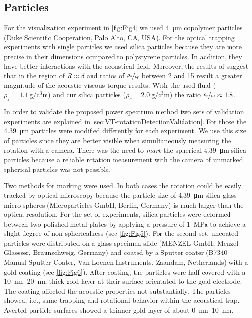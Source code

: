 \subsection{Particles \label{sec:VT-particles}}
For the visualization experiment in \cref{fig:Fig4} we used \SI{4}{\micro\meter} 
copolymer particles (Duke Scientific Cooperation, Palo Alto, CA, USA). For the 
optical trapping experiments with single particles we used silica particles 
because they are more precise in their dimensions compared to polystyrene 
particles. In addition, they have better interactions
with the acoustical field. Moreover, the results of \citeauthor{hahn2016} 
\cite{hahn2016} suggest that in the region of $R \approx \delta$ and ratios of 
$\sfrac{\rho_{\text{s}}}{\rho_{\text{f}}}$ between 2 and 15 result a greater 
magnitude of the acoustic viscous torque results. With the used fluid ($\rho_{f} 
= \SI{1.1}{\gram\per\cubic\centi\meter}$) and our silica particles ($\rho_{s} = 
\SI{2.0}{\gram\per\cubic\centi\meter}$) the ratio 
$\sfrac{\rho_{\text{s}}}{\rho_{\text{f}}} \approx 1.8$.

In order to validate the proposed power spectrum method two sets of validation 
experiments are explained in \cref{sec:VT-rotationDetectionValidation}. For those 
the \SI{4.39}{\micro\meter} particles were modified differently for each 
experiment. We use this size of particles since they are better visible when 
simultaneously measuring the rotation with a camera. There was the need to 
\emph{mark} the spherical \SI{4.39}{\micro\meter} silica particles because a 
reliable rotation measurement with the camera of unmarked spherical particles 
was not possible.

Two methods for marking were used. In both cases the rotation could be easily 
tracked by optical microscopy because the particle size of 
\SI{4.39}{\micro\meter} silica glass micro-spheres (Microparticles
GmbH, Berlin, Germany) is much larger than the optical resolution.
For the set of experiments, silica particles were deformed between two polished 
metal plates by applying a pressure of \SI{1}{\mega\pascal} to achieve a slight 
degree of non-sphericalness (see \cref{fig:Fig5}). For the second set, uncoated 
particles were distributed on a glass specimen slide (MENZEL GmbH, 
Menzel-Glaesser, Braunschweig, Germany) and coated by a Sputter coater (B7340 
Manual Sputter Coater, Van Loenen Instruments, Zaandam, Netherlands) with a gold 
coating (see \cref{fig:Fig6}). After coating, the particles were half-covered 
with a \SIrange{10}{20}{\nano\meter} thick gold layer at their surface 
orientated to the gold electrode. The coating affected the acoustic properties 
not substantially. The particles showed, i.e., same trapping and rotational 
behavior within the acoustical trap. Averted particle surfaces showed a thinner 
gold layer of about \SIrange{0}{10}{\nano\meter}.
